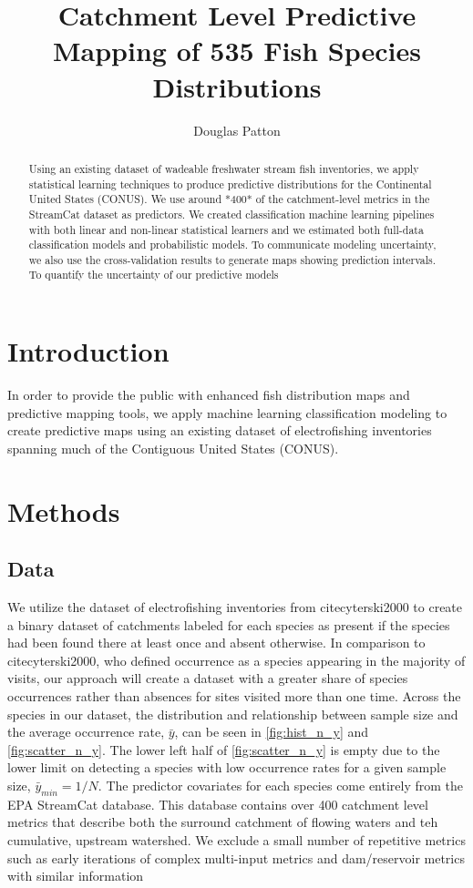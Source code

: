 \documentclass[]{article}
\title{Catchment Level Predictive Mapping of 535 Fish Species Distributions}
\author{Douglas Patton}
\begin{document}
\maketitle

\begin{abstract}
Using an existing dataset of wadeable freshwater stream fish inventories, we apply statistical learning techniques to produce predictive distributions for the Continental United States (CONUS). We use around *400* of the catchment-level metrics in the StreamCat dataset as predictors. We created classification machine learning pipelines with both linear and non-linear statistical learners and we estimated both full-data classification models and probabilistic models. To communicate modeling uncertainty, we also use the cross-validation results to generate maps showing prediction intervals.  To quantify the uncertainty of our predictive models
\end{abstract}

\section{Introduction}
In order to provide the public with enhanced fish distribution maps and predictive mapping tools, we apply machine learning classification modeling to create predictive maps using an existing dataset of electrofishing inventories spanning much of the Contiguous United States (CONUS).  

\section{Methods}
\subsection{Data}
We utilize the dataset of electrofishing inventories from cite{cyterski2000} to create a binary dataset of catchments labeled for each species as present if the species had been found there at least once and absent otherwise. In comparison to cite{cyterski2000}, who defined occurrence as a species appearing in the majority of visits, our approach will create a dataset with a greater share of species occurrences rather than absences for sites visited more than one time. 
Across the species in our dataset, the distribution and relationship between sample size and the average occurrence rate, $\bar{y}$, can be seen in \ref{fig:hist_n_y} and \ref{fig:scatter_n_y}. The lower left half of \ref{fig:scatter_n_y} is empty due to the lower limit on detecting a species with low occurrence rates for a given sample size, $\bar{y}_{min}=1/N$.
The predictor covariates for each species come entirely from the EPA StreamCat database. This database contains over 400 catchment level metrics that describe both the surround catchment of flowing waters and teh cumulative, upstream watershed. We exclude a small number of repetitive metrics such as early iterations of complex multi-input metrics and dam/reservoir metrics with similar information
\end{document}
